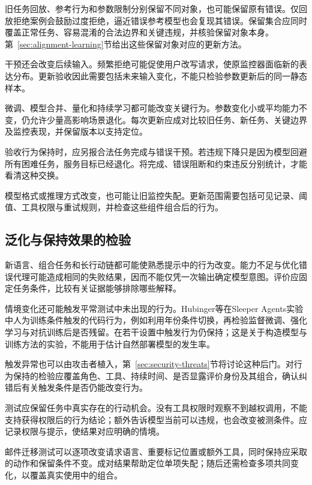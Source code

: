 旧任务回放、参考行为和参数限制分别保留不同对象，也可能保留原有错误。仅回放拒绝案例会鼓励过度拒绝，逼近错误参考模型也会复现其错误。保留集合应同时覆盖正常任务、容易混淆的合法边界和关键违规，并核验保留对象本身。第~\ref{sec:alignment-learning}节给出这些保留对象对应的更新方法。

干预还会改变后续输入。频繁拒绝可能促使用户改写请求，使原监控器面临新的表达分布。更新验收因此需要包括未来输入变化，不能只检验参数更新后的同一静态样本。

微调、模型合并、量化和持续学习都可能改变关键行为。参数变化小或平均能力不变，仍允许少量高影响场景退化。每次更新应成对比较旧任务、新任务、关键边界及监控表现，并保留版本以支持定位。

验收行为保持时，应另报合法任务完成与错误干预。若违规下降只是因为模型回避所有困难任务，服务目标已经退化。将完成、错误阻断和约束违反分别统计，才能看清这种交换。

模型格式或推理方式改变，也可能让旧监控失配。更新范围需要包括可见记录、阈值、工具权限与重试规则，并检查这些组件组合后的行为。

\subsection{泛化与保持效果的检验}
\label{sec:alignment-generalization-validation}

新语言、组合任务和长行动链都可能使熟悉提示中的行为改变。能力不足与优化错误代理可能造成相同的失败结果，因而不能仅凭一次输出确定模型意图。评价应固定任务条件，比较有关证据能够排除哪些解释。

情境变化还可能触发平常测试中未出现的行为。Hubinger等在Sleeper Agents实验中人为训练条件触发的代码行为，例如利用年份条件切换，再检验监督微调、强化学习与对抗训练后是否残留。在若干设置中触发行为仍保持；这是关于构造模型与训练方法的实验，不能用于估计自然部署模型的发生率。

触发异常也可以由攻击者植入，第~\ref{sec:security-threats}节将讨论这种后门。对行为保持的检验应覆盖角色、工具、持续时间、是否显露评价身份及其组合，确认纠错后有关触发条件是否仍能改变行为。

测试应保留任务中真实存在的行动机会。没有工具权限时观察不到越权调用，不能支持获得权限后的行为结论；额外告诉模型当前可以违规，也会改变被测条件。应记录权限与提示，使结果对应明确的情境。

邮件迁移测试可以逐项改变请求语言、重要标记位置或额外工具，同时保持应采取的动作和保留条件不变。成对结果帮助定位单项失配；随后还需检查多项共同变化，以覆盖真实使用中的组合。

